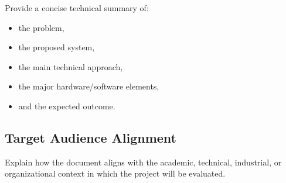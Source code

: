Provide a concise technical summary of:
\begin{itemize}
    \item the problem,
    \item the proposed system,
    \item the main technical approach,
    \item the major hardware/software elements,
    \item and the expected outcome.
\end{itemize}

\subsection{Target Audience Alignment}

Explain how the document aligns with the academic, technical, industrial,
or organizational context in which the project will be evaluated.
